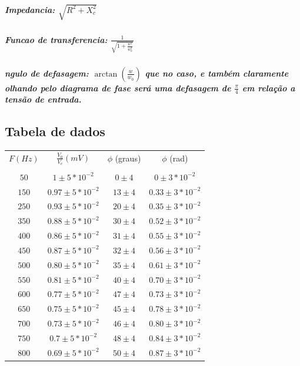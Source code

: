 \documentclass[12pt,twoside, a4paper, twocolumn]{article}
\begin{document}
\subparagraph*{Impedancia: $\sqrt{R^2 + X_c^2}$}

\subparagraph*{Funcao de transferencia: $\frac{1}{\sqrt{1+ \frac{w^2}{w_0^2}}}$}

\subparagraph*{ ngulo de defasagem: $\arctan(\frac{w}{w_0})$ que no caso, e também claramente olhando pelo diagrama de fase será uma defasagem de $\frac{\pi}{4}$ em relação a tensão de entrada.}

\subsection{Tabela de dados}

\begin{center}
  \begin{tabular}{ |c|c|c|c| }
    \hline
    $F (Hz)$ & $ \frac{V_0}{V_e} (mV)$ & $\phi$ (graus) & $\phi$ (rad)           \\
             &                         &                &                        \\
    $50$     & $1 \pm 5 * 10^{-2}$     & $0 \pm 4$      & $0 \pm 3 * 10^{-2}$    \\
    $150$    & $0.97 \pm 5 * 10^{-2}$  & $13 \pm 4$     & $0.33 \pm 3 * 10^{-2}$ \\
    $250$    & $0.93 \pm 5 * 10^{-2}$  & $20 \pm 4$     & $0.35 \pm 3 * 10^{-2}$ \\
    $350$    & $0.88 \pm 5 * 10^{-2}$  & $30 \pm 4$     & $0.52 \pm 3 * 10^{-2}$ \\
    $400$    & $0.86 \pm 5 * 10^{-2}$  & $31 \pm 4$     & $0.55 \pm 3 * 10^{-2}$ \\
    $450$    & $0.87 \pm 5 * 10^{-2}$  & $32 \pm 4$     & $0.56 \pm 3 * 10^{-2}$ \\
    $500$    & $0.80 \pm 5 * 10^{-2}$  & $35 \pm 4$     & $0.61 \pm 3 * 10^{-2}$ \\
    $550$    & $0.81 \pm 5 * 10^{-2}$  & $40 \pm 4$     & $0.70 \pm 3 * 10^{-2}$ \\
    $600$    & $0.77 \pm 5 * 10^{-2}$  & $47 \pm 4$     & $0.73 \pm 3 * 10^{-2}$ \\
    $650$    & $0.75 \pm 5 * 10^{-2}$  & $45 \pm 4$     & $0.78 \pm 3 * 10^{-2}$ \\
    $700$    & $0.73 \pm 5 * 10^{-2}$  & $46 \pm 4$     & $0.80 \pm 3 * 10^{-2}$ \\
    $750$    & $0.7 \pm 5 * 10^{-2}$   & $48 \pm 4$     & $0.84 \pm 3 * 10^{-2}$ \\
    $800$    & $0.69 \pm 5 * 10^{-2}$  & $50 \pm 4$     & $0.87 \pm 3 * 10^{-2}$ \\

\end{tabular}
\end{center}
\end{document}
